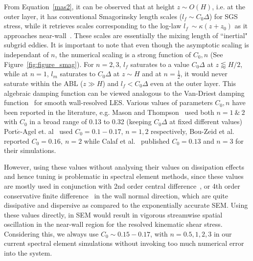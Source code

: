 From Equation~\ref{mas2}, it can be observed that at height $z \sim O(H)$, i.e. at the outer layer, it has conventional Smagorinsky length scales ($l_f \sim C_0 \Delta$) for SGS stress, while it retrieves scales corresponding to the log-law $l_f \ \sim \kappa (z + z_0)$ as it approaches near-wall~\cite{mason0,mason}. These scales are essentially the mixing length of ``inertial" subgrid eddies. It is important to note that even though the asymptotic scaling is independant of $n$, the numerical scaling is a strong function of $C_0, n$ (See Figure~\ref{fig:figure_smag}). For $n = 2, 3$,      $ l_f$ saturates to a value $C_0 \Delta$ at $z \lessapprox H/2$, while at $n = 1$, $l_m$ saturates to $C_0\Delta$ at $z \sim H$ and at $n = \frac{1}{2}$, it would never saturate within the ABL ($z \gg H$) and $l_f < C_0\Delta$ even at the outer layer. This algebraic damping function can be viewed analogous to the Van-Driest damping function~\cite{van-Driest,bers} for smooth wall-resolved LES. Various values of parameter{s} $C_0, n$ have been reported in the literature, e.g. Mason and Thompson~\cite{mason} used both $n = 1 \ \& \ 2$ with $C_0$ in a broad range of 0.13 to 0.32 (keeping $C_0\Delta$ at fixed different values)  Port$\acute{e}$-Agel et. al~\cite{porte1fun} used $C_0 = 0.1-0.17$, $n = 1,2$ respectively, Bou-Zeid et al.~\cite{bou1} reported $C_0 = 0.16, \ n = 2$ while Calaf et al.~\cite{calaf} published $C_0 = 0.13$ and $n = 3$ for their simulations. 
 \\
\par 
However, using these values without analysing their values on dissipation effects and hence tuning is problematic in spectral element methods, since these values are mostly used in conjunction with 2nd order central difference~\cite{porte1fun,porte1a}, or 4th order conservative finite difference~\cite{meyers2} in the wall normal direction, which are quite dissipative and dispersive as compared to the exponentially accurate SEM. Using these values directly, in SEM would result in vigorous streamwise spatial oscillation in the near-wall region for the resolved kinematic shear stress. Considering this, we always use $C_0 \sim 0.15-0.17$, with $n = 0.5, 1, 2, 3$ in our current spectral element simulations without invoking too much numerical error into the system. 
